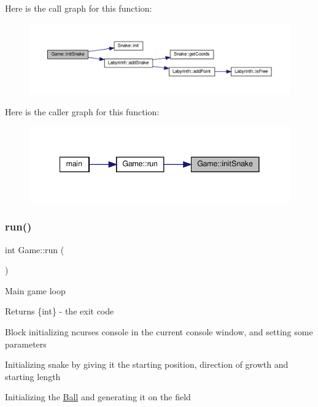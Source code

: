 Here is the call graph for this function\+:
\nopagebreak
\begin{figure}[H]
\begin{center}
\leavevmode
\includegraphics[width=350pt]{class_game_a0e8435182e77e921b5ba0471a8bfb20d_cgraph}
\end{center}
\end{figure}
Here is the caller graph for this function\+:
\nopagebreak
\begin{figure}[H]
\begin{center}
\leavevmode
\includegraphics[width=341pt]{class_game_a0e8435182e77e921b5ba0471a8bfb20d_icgraph}
\end{center}
\end{figure}
\mbox{\label{class_game_a99fb161fbbe87d25a8b73265a0611e58}} 
\subsubsection{\texorpdfstring{run()}{run()}}
{\footnotesize\ttfamily int Game\+::run (\begin{DoxyParamCaption}{ }\end{DoxyParamCaption})}

Main game loop \begin{DoxyReturn}{Returns}
\{int\} -\/ the exit code 
\end{DoxyReturn}
Block initializing ncurses console in the current console window, and setting some parameters

Initializing snake by giving it the starting position, direction of growth and starting length

Initializing the \mbox{\hyperlink{class_ball}{Ball}} and generating it on the field

